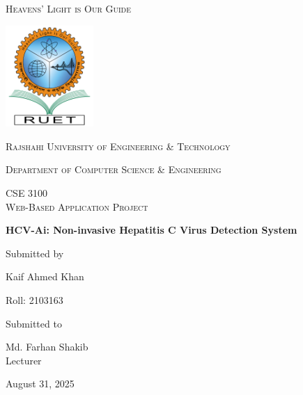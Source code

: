 \documentclass[12pt,a4paper]{article}
\newcommand{\univ}{Rajshahi University of Engineering \& Technology}
\newcommand{\thedept}{Department of Computer Science \& Engineering}
\newcommand{\thecourse}{CSE 3100 \\ Web-Based Application Project}
\newcommand{\labgraph}{HCV-Ai: Non-invasive Hepatitis C Virus Detection System}
\newcommand{\thetitle}{\labgraph}
\newcommand{\theauthor}{Kaif Ahmed Khan}
\newcommand{\thesupervisor}{Md. Farhan Shakib}
\newcommand{\lec}{Lecturer}
\newcommand{\thedesignation}{\lec}
\begin{document}
\begin{titlepage}
\centering
{\scshape Heavens' Light is Our Guide\par}\vspace{.25cm}
\includegraphics[width=0.25\textwidth]{logo}\par\vspace{1cm}
{\scshape\LARGE \univ\par}
\vspace{.5cm}
{\scshape\Large \thedept\par}
\vspace{1cm}
{\scshape\Large \thecourse\par}
\vspace{1cm}
{\huge\bfseries \thetitle\par}
\vspace{1cm}
Submitted by\par
{\Large \theauthor\par}
{\Large Roll: 2103163\par}
\vfill
Submitted to\par
{\Large \thesupervisor\\\thedesignation\par}
\vfill
{\large August 31, 2025\par}
\end{titlepage}
\tableofcontents
\listoffigures
\newpage






\end{document}
